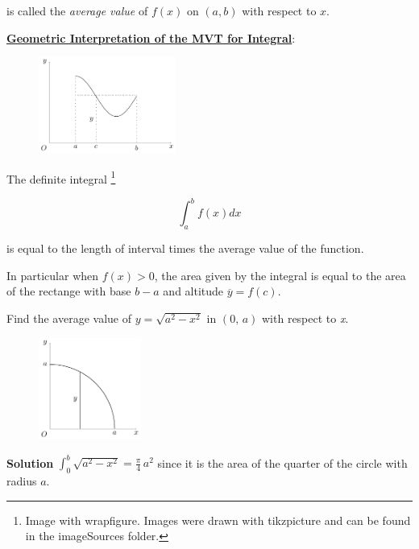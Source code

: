 \documentclass[11pt]{amsbook}
\begin{document}

is called the \textit{average value} of $f(x)$ on $(a, b)$ with respect to $x$.

\centerline{\textbf{\underline{Geometric Interpretation of the MVT for Integral}}:}

\begin{figure} 
\centering
\includegraphics[width=0.40\textwidth]{images/b1p2-355-fig01.pdf}
\label{fig:b1p2-355-fig01.pdf}
\end{figure}

The definite integral  \footnote{Image with wrapfigure. Images were drawn with tikzpicture and can be found in the imageSources folder.}

\[
\int_{a}^{b} f(x) dx
\]

is equal to the length of interval times the average value of the function. 

In particular when $f(x) > 0$, the area given by the integral is equal to the area of the rectange with base $b-a$ and altitude $\overline{y} = f(c)$.

\begin{exmp}
Find the average value of  $ y = \sqrt{a^2 - x^2 }$ in $(0,\, a)$ with respect to \textit{x}.
\end{exmp}

 \begin{figure}
 \centering
\includegraphics[width=0.30\textwidth]{images/b1p2-355-fig02.pdf} 
\label{fig:b1p2-355-fig02}
\end{figure}

\textbf{Solution} \quad
\( 
\int_{0}^{b} \sqrt{ a^2 - x^2 } = \frac{\pi}{4} \, a^2
\)
since it is the area of the quarter of the circle with radius $a$.
\end{document}
